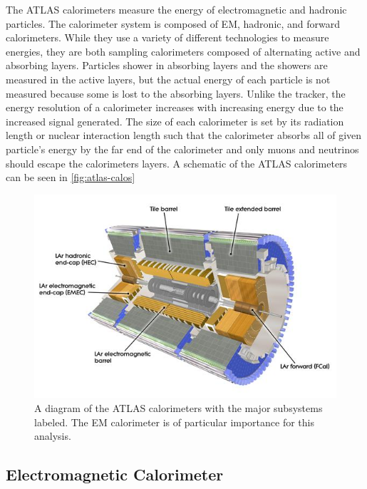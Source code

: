 The \ac{ATLAS} calorimeters measure the energy of electromagnetic and hadronic particles. The calorimeter system is composed of \ac{EM}, hadronic, and forward calorimeters. While they use a variety of different technologies to measure energies, they are both sampling calorimeters composed of alternating active and absorbing layers. Particles shower in absorbing layers and the showers are measured in the active layers, but the actual energy of each particle is not measured because some is lost to the absorbing layers. Unlike the tracker, the energy resolution of a calorimeter increases with increasing energy due to the increased signal generated. The size of each calorimeter is set by its radiation length or nuclear interaction length such that the calorimeter absorbs all of given particle's energy by the far end of the calorimeter and only muons and neutrinos should escape the calorimeters layers. A schematic of the \ac{ATLAS} calorimeters can be seen in \autoref{fig:atlas-calos}


\begin{figure}[htbp]
\centering
\includegraphics[width=.8\textwidth]{figures/Detector/atlas-calorimeters.jpg}
\caption{A diagram of the \ac{ATLAS} calorimeters with the major subsystems labeled. The \ac{EM} calorimeter is of particular importance for this analysis. \cite{calorimeters}}
\label{fig:atlas-calos}
\end{figure}


\subsection{Electromagnetic Calorimeter}

